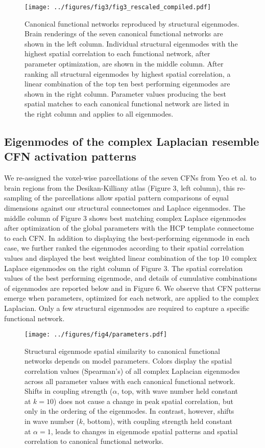 \documentclass{article}
\begin{document}
\begin{figure}[ht]
 \centering
 \texttt{[image: ../figures/fig3/fig3\_rescaled\_compiled.pdf]}
 \caption{Canonical functional networks reproduced by structural eigenmodes. Brain renderings of the seven canonical functional networks are shown in the left column. Individual structural eigenmodes with the highest spatial correlation to each functional network, after parameter optimization, are shown in the middle column. After ranking all structural eigenmodes by highest spatial correlation, a linear combination of the top ten best performing eigenmodes are shown in the right column. Parameter values producing the best spatial matches to each canonical functional network are listed in the right column and applies to all eigenmodes.}
 \label{fig:fig3}
\end{figure}

\subsection{Eigenmodes of the complex Laplacian resemble CFN activation patterns}
We re-assigned the voxel-wise parcellations of the seven CFNs from Yeo et al. \cite{Yeo2011} to brain regions from the Desikan-Killiany atlas (Figure 3, left column), this re-sampling of the parcellations allow spatial pattern comparisons of equal dimensions against our structural connectomes and Laplace eigenmodes. The middle column of Figure 3 shows best matching complex Laplace eigenmodes after optimization of the global parameters with the HCP template connectome to each CFN. In addition to displaying the best-performing eigenmode in each case, we further ranked the eigenmodes according to their spatial correlation values and displayed the best weighted linear combination of the top 10 complex Laplace eigenmodes on the right column of Figure 3. The spatial correlation values of the best performing eigenmode, and details of cumulative combinations of eigenmodes are reported below and in Figure 6. We observe that CFN patterns emerge when parameters, optimized for each network, are applied to the complex Laplacian. Only a few structural eigenmodes are required to capture a specific functional network. 


\begin{figure}[ht]
\centering
\texttt{[image: ../figures/fig4/parameters.pdf]}
\caption{Structural eigenmode spatial similarity to canonical functional networks depends on model parameters. Colors display the spatial correlation values (Spearman's) of all complex Laplacian eigenmodes across all parameter values with each canonical functional network. Shifts in coupling strength ($\alpha$, top, with wave number held constant at $k=10$) does not cause a change in peak spatial correlation, but only in the ordering of the eigenmodes. In contrast, however, shifts in wave number ($k$, bottom), with coupling strength held constant at $\alpha = 1$, leads to changes in eigenmode spatial patterns and spatial correlation to canonical functional networks.}
\label{fig:fig4}
\end{figure}
\end{document}
